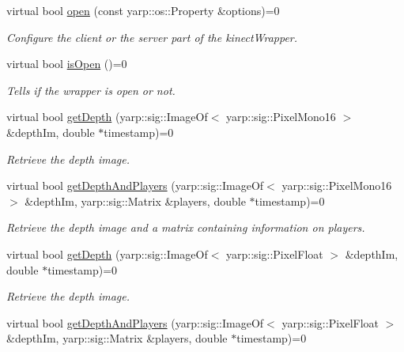 \begin{DoxyCompactItemize}
\item 
virtual bool \hyperlink{classkinectWrapper_1_1KinectWrapper_ad3781beb01dd66d4d7946336ff72b52c}{open} (const yarp\+::os\+::\+Property \&options)=0
\begin{DoxyCompactList}\small\item\em Configure the client or the server part of the kinect\+Wrapper. \end{DoxyCompactList}\item 
virtual bool \hyperlink{classkinectWrapper_1_1KinectWrapper_a40285a4cca39849bd49b759ea122cd17}{is\+Open} ()=0
\begin{DoxyCompactList}\small\item\em Tells if the wrapper is open or not. \end{DoxyCompactList}\item 
virtual bool \hyperlink{classkinectWrapper_1_1KinectWrapper_a67d94ddca5fdcbe8786e7ccbe1f5c068}{get\+Depth} (yarp\+::sig\+::\+Image\+Of$<$ yarp\+::sig\+::\+Pixel\+Mono16 $>$ \&depth\+Im, double $\ast$timestamp)=0
\begin{DoxyCompactList}\small\item\em Retrieve the depth image. \end{DoxyCompactList}\item 
virtual bool \hyperlink{classkinectWrapper_1_1KinectWrapper_a728566b395772504aee383bd761db018}{get\+Depth\+And\+Players} (yarp\+::sig\+::\+Image\+Of$<$ yarp\+::sig\+::\+Pixel\+Mono16 $>$ \&depth\+Im, yarp\+::sig\+::\+Matrix \&players, double $\ast$timestamp)=0
\begin{DoxyCompactList}\small\item\em Retrieve the depth image and a matrix containing information on players. \end{DoxyCompactList}\item 
virtual bool \hyperlink{classkinectWrapper_1_1KinectWrapper_a6703382dcc56e189a0b90921a7e06cc3}{get\+Depth} (yarp\+::sig\+::\+Image\+Of$<$ yarp\+::sig\+::\+Pixel\+Float $>$ \&depth\+Im, double $\ast$timestamp)=0
\begin{DoxyCompactList}\small\item\em Retrieve the depth image. \end{DoxyCompactList}\item 
virtual bool \hyperlink{classkinectWrapper_1_1KinectWrapper_ae5f7c0f9948262149ee032470baef9bc}{get\+Depth\+And\+Players} (yarp\+::sig\+::\+Image\+Of$<$ yarp\+::sig\+::\+Pixel\+Float $>$ \&depth\+Im, yarp\+::sig\+::\+Matrix \&players, double $\ast$timestamp)=0

\end{DoxyCompactItemize}

